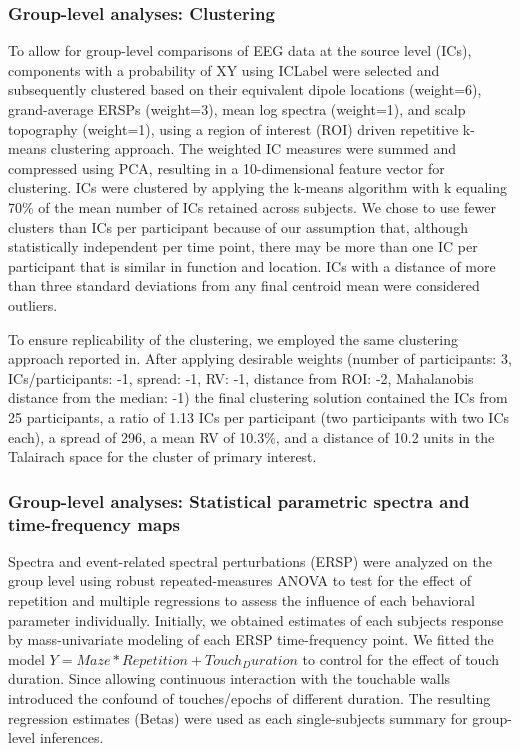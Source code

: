 \subsubsection{Group-level analyses: Clustering}
To allow for group-level comparisons of EEG data at the source level (ICs), components with a probability of XY using ICLabel were selected and subsequently clustered based on their equivalent dipole locations (weight=6), grand-average ERSPs (weight=3), mean log spectra (weight=1), and scalp topography (weight=1), using a region of interest (ROI) driven repetitive k-means clustering approach\citep{cleaning_FH2018}. The weighted IC measures were summed and compressed using PCA, resulting in a 10-dimensional feature vector for clustering. ICs were clustered by applying the k-means algorithm with k equaling 70\% of the mean number of ICs retained across subjects. We chose to use fewer clusters than ICs per participant because of our assumption that, although statistically independent per time point, there may be more than one IC per participant that is similar in function and location. ICs with a distance of more than three standard deviations from any final centroid mean were considered outliers.

To ensure replicability of the clustering, we employed the same clustering approach reported in\cite{cleaning_FH2018}. After applying desirable weights (number of participants: 3, ICs/participants: -1, spread: -1, RV: -1, distance from ROI: -2, Mahalanobis distance from the median: -1) the final clustering solution contained the ICs from 25 participants, a ratio of 1.13 ICs per participant (two participants with two ICs each), a spread of 296, a mean RV of 10.3\%, and a distance of 10.2 units in the Talairach space for the cluster of primary interest.

\subsubsection{Group-level analyses: Statistical parametric spectra and time-frequency maps}
Spectra and event-related spectral perturbations (ERSP\citep{Makeig2004}) were analyzed on the group level using robust repeated-measures ANOVA\citep{Pernet2011} to test for the effect of repetition and multiple regressions to assess the influence of each behavioral parameter individually. Initially, we obtained estimates of each subjects response by mass-univariate modeling of each ERSP time-frequency point. We fitted the model $Y = Maze*Repetition + Touch_Duration$ to control for the effect of touch duration. Since allowing continuous interaction with the touchable walls introduced the confound of touches/epochs of different duration. The resulting regression estimates (Betas) were used as each single-subjects summary for group-level inferences.

